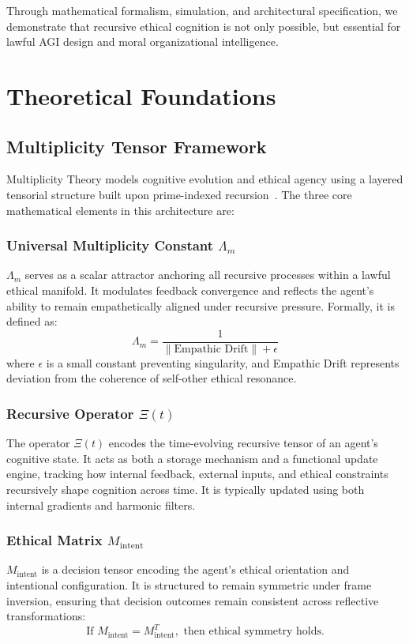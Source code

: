 \documentclass[12pt]{article}
\begin{document}
Through mathematical formalism, simulation, and architectural specification, we demonstrate that recursive ethical cognition is not only possible, but essential for lawful AGI design and moral organizational intelligence.


\section{Theoretical Foundations}

\subsection{Multiplicity Tensor Framework}

Multiplicity Theory models cognitive evolution and ethical agency using a layered tensorial structure built upon prime-indexed recursion~\cite{vanGelder2023pirtm}. The three core mathematical elements in this architecture are:

\subsubsection*{Universal Multiplicity Constant $\Lambda_m$}
$\Lambda_m$ serves as a scalar attractor anchoring all recursive processes within a lawful ethical manifold. It modulates feedback convergence and reflects the agent’s ability to remain empathetically aligned under recursive pressure. Formally, it is defined as:
\begin{equation}
\Lambda_m = \frac{1}{\| \text{Empathic Drift} \| + \epsilon}
\end{equation}
where $\epsilon$ is a small constant preventing singularity, and Empathic Drift represents deviation from the coherence of self-other ethical resonance.

\subsubsection*{Recursive Operator $\Xi(t)$}
The operator $\Xi(t)$ encodes the time-evolving recursive tensor of an agent’s cognitive state. It acts as both a storage mechanism and a functional update engine, tracking how internal feedback, external inputs, and ethical constraints recursively shape cognition across time. It is typically updated using both internal gradients and harmonic filters.

\subsubsection*{Ethical Matrix $M_{\text{intent}}$}
$M_{\text{intent}}$ is a decision tensor encoding the agent’s ethical orientation and intentional configuration. It is structured to remain symmetric under frame inversion, ensuring that decision outcomes remain consistent across reflective transformations:
\begin{equation}
\text{If } M_{\text{intent}} = M_{\text{intent}}^T, \text{ then ethical symmetry holds.}
\end{equation}
\end{document}
